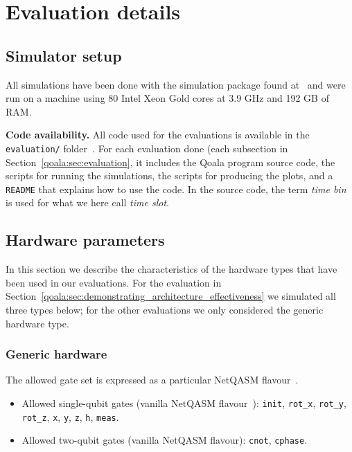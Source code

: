 \section{Evaluation details}
\label{qoala:sec:app:evaluation}

\subsection{Simulator setup}
All simulations have been done with the simulation package found at~\cite{qoala2023simulator}
and were run on a machine using 80 Intel Xeon Gold cores at 3.9 GHz and 192 GB of RAM.

\textbf{Code availability.}
All code used for the evaluations is available in the \texttt{evaluation/} folder~\cite{qoala2023simulator}.
For each evaluation done (each subsection in Section~\ref{qoala:sec:evaluation}, it includes the Qoala program source code, the scripts for running the simulations, the scripts for producing the plots, and a \texttt{README} that explains how to use the code.
In the source code, the term \textit{time bin} is used for what we here call \textit{time slot}.

\subsection{Hardware parameters}
In this section we describe the characteristics of the hardware types that have been used in our evaluations.
For the evaluation in Section~\ref{qoala:sec:demonstrating_architecture_effectiveness} we simulated all three types below;
for the other evaluations we only considered the generic hardware type.

\subsubsection{Generic hardware}
The allowed gate set is expressed as a particular NetQASM flavour~\cite{dahlberg2022netqasm}.

\begin{itemize}
  \item Allowed single-qubit gates (vanilla NetQASM flavour~\cite{dahlberg2022netqasm}):
  \texttt{init}, \texttt{rot\_x}, \texttt{rot\_y}, \texttt{rot\_z}, \texttt{x}, \texttt{y}, \texttt{z}, \texttt{h}, \texttt{meas}.
  \item Allowed two-qubit gates (vanilla NetQASM flavour): \texttt{cnot}, \texttt{cphase}.
\end{itemize}

